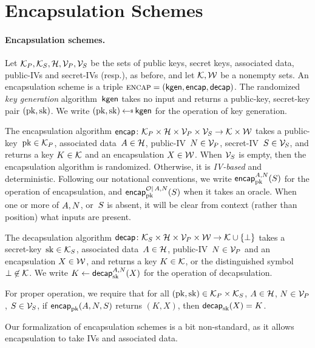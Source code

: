 \section{Encapsulation Schemes}
\label{sec:kem}

\paragraph{Encapsulation schemes. }
Let $\pubkeys, \seckeys, \adata, \pubivs, \secivs$ be the sets of public keys, secret keys, associated data, public-IVs and secret-IVs (resp.), as before, and let $\keys,\wraps$ be a nonempty sets.
%
An encapsulation scheme is a triple $\encapscheme=(\pkgen,\encap,\decap)$.   The randomized \emph{key generation} algorithm~$\pkgen$ takes no input and returns a public-key, secret-key pair $(\pk,\sk)$.  We write $(\pk,\sk)\getsr\pkgen$ for the operation of key generation. 

The encapsulation algorithm $\encap \colon \pubkeys \times \adata \times \pubivs \times \secivs \to \keys \times \wraps$ takes a public-key~$\pk\in\pubkeys$, associated data~$\header \in \adata$, public-IV~$\pubiv \in \pubivs$, secret-IV~$\seciv \in \secivs$, and returns a key $K \in \keys$ and an encapsulation $X \in \wraps$. 
When $\secivs$ is empty, then the encapsulation algorithm is randomized.  Otherwise, it is \emph{IV-based} and deterministic.  Following our notational conventions, we write $\encapprim{\pk}{\header,\pubiv}{\seciv}$ for the operation of encapsulation, and $\encapprimO{\pk}{\header,\pubiv}{\seciv}{\mathcal{O}}$ when it takes an oracle.  When one or more of $\header,\pubiv$, or~$\seciv$ is absent, it will be clear from context (rather than position) what inputs are present.

The decapsulation algorithm $\decap \colon \seckeys \times \adata \times \pubivs \times \wraps \to \keys \cup \{\bot\}$ takes a secret-key~$\sk\in\seckeys$, associated data~$\header \in \adata$, public-IV~$\pubiv \in \pubivs$ and an encapsulation $X \in \wraps$, and returns a key $K \in \keys$, or the distinguished symbol~$\bot \not\in \keys$.  We write $K \gets \decapprim{\sk}{\header,\pubiv}{\wrap}$ for the operation of decapsulation. 

For proper operation, we require that for all $(\pk,\sk)\in\pubkeys\times\seckeys$, $\header\in\adata$, $\pubiv\in\pubivs$, $\seciv\in\secivs$, if $\encap_{\pk}(\header,\pubiv,\seciv)$ returns $(K,X)$, then $\decap_{\sk}(X)=K$.

Our formalization of encapsulation schemes is a bit non-standard, as it allows encapsulation to take IVs and associated data.

